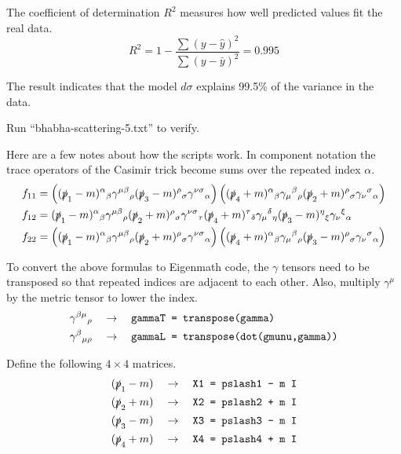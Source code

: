 \documentclass[12pt]{article}
\begin{document}
\noindent
The coefficient of determination $R^2$ measures how well predicted values fit the real data.
\begin{equation*}
R^2=1-\frac{\sum(y-\hat{y})^2}{\sum(y-\bar{y})^2}=0.995
\end{equation*}

\noindent
The result indicates that the model $d\sigma$ explains 99.5\% of the variance in the data.

\bigskip
\noindent
Run ``bhabha-scattering-5.txt'' to verify.

\newpage
\noindent
Here are a few notes about how the scripts work.
In component notation the trace operators of the Casimir trick become sums over the repeated index $\alpha$.
\begin{align*}
f_{11}&=
\left(
(\slashed{p}_1-m)^\alpha{}_\beta
\gamma^{\mu\beta}{}_\rho
(\slashed{p}_3-m)^\rho{}_\sigma
\gamma^{\nu\sigma}{}_\alpha
\right)
\left(
(\slashed{p}_4+m)^\alpha{}_\beta
\gamma_\mu{}^\beta{}_\rho
(\slashed{p}_2+m)^\rho{}_\sigma
\gamma_\nu{}^\sigma{}_\alpha
\right)
\\
f_{12}&=
(\slashed{p}_1-m)^\alpha{}_\beta
\gamma^{\mu\beta}{}_\rho
(\slashed{p}_2+m)^\rho{}_\sigma
\gamma^{\nu\sigma}{}_\tau
(\slashed{p}_4+m)^\tau{}_\delta
\gamma_\mu{}^\delta{}_\eta
(\slashed{p}_3-m)^\eta{}_\xi
\gamma_\nu{}^\xi{}_\alpha
\\
f_{22}&=
\left(
(\slashed{p}_1-m)^\alpha{}_\beta
\gamma^{\mu\beta}{}_\rho
(\slashed{p}_2+m)^\rho{}_\sigma
\gamma^{\nu\sigma}{}_\alpha
\right)
\left(
(\slashed{p}_4+m)^\alpha{}_\beta
\gamma_\mu{}^\beta{}_\rho
(\slashed{p}_3-m)^\rho{}_\sigma
\gamma_\nu{}^\sigma{}_\alpha
\right)
\end{align*}

\noindent
To convert the above formulas to Eigenmath code,
the $\gamma$ tensors need to be transposed
so that repeated indices are adjacent to each other.
Also, multiply $\gamma^\mu$ by the metric tensor to lower the index.
\begin{align*}
\gamma^{\beta\mu}{}_\rho\quad&\rightarrow\quad
\text{\tt gammaT = transpose(gamma)}\\
\gamma^\beta{}_{\mu\rho}\quad&\rightarrow\quad
\text{\tt gammaL = transpose(dot(gmunu,gamma))}
\end{align*}

\noindent
Define the following $4\times4$ matrices.
\begin{align*}
(\slashed{p}_1-m)\quad&\rightarrow\quad\text{\tt X1 = pslash1 - m I}\\
(\slashed{p}_2+m)\quad&\rightarrow\quad\text{\tt X2 = pslash2 + m I}\\
(\slashed{p}_3-m)\quad&\rightarrow\quad\text{\tt X3 = pslash3 - m I}\\
(\slashed{p}_4+m)\quad&\rightarrow\quad\text{\tt X4 = pslash4 + m I}
\end{align*}
\end{document}
